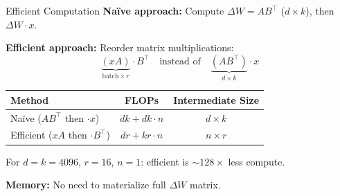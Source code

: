 \documentclass[aspectratio=169,10pt]{beamer}
\begin{document}
\begin{frame}{Efficient Computation}
	\textbf{Na\"ive approach:} Compute $\Delta W = AB^\top$ ($d \times k$), then $\Delta W \cdot x$.

	\vspace{0.2cm}
	\textbf{Efficient approach:} Reorder matrix multiplications:
	$$\underbrace{(xA)}_{\text{batch} \times r} \cdot B^\top \quad \text{instead of} \quad \underbrace{(AB^\top)}_{d \times k} \cdot x$$

	\vspace{0.3cm}
	\begin{table}
		\centering
		\small
		\begin{tabular}{lcc}
			\toprule
			\textbf{Method}                      & \textbf{FLOPs}    & \textbf{Intermediate Size} \\
			\midrule
			Na\"ive ($AB^\top$ then $\cdot x$)   & $dk + dk \cdot n$ & $d \times k$               \\
			Efficient ($xA$ then $\cdot B^\top$) & $dr + kr \cdot n$ & $n \times r$               \\
			\bottomrule
		\end{tabular}
	\end{table}

	\vspace{0.2cm}
	For $d = k = 4096$, $r = 16$, $n = 1$: efficient is $\sim 128\times$ less compute.

	\vspace{0.2cm}
	\textbf{Memory:} No need to materialize full $\Delta W$ matrix.
\end{frame}
\end{document}
